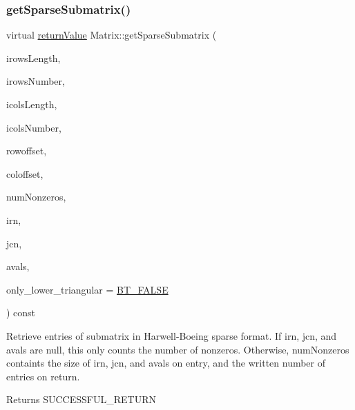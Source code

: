 \subsubsection{\texorpdfstring{get\+Sparse\+Submatrix()}{getSparseSubmatrix()}\hspace{0.1cm}{\footnotesize\ttfamily [4/4]}}
{\footnotesize\ttfamily virtual \hyperlink{_message_handling_8hpp_a81d556f613bfbabd0b1f9488c0fa865e}{return\+Value} Matrix\+::get\+Sparse\+Submatrix (\begin{DoxyParamCaption}\item[{\hyperlink{_types_8hpp_ab6fd6105e64ed14a0c9281326f05e623}{int\+\_\+t}}]{irows\+Length,  }\item[{const \hyperlink{_types_8hpp_ab6fd6105e64ed14a0c9281326f05e623}{int\+\_\+t} $\ast$const}]{irows\+Number,  }\item[{\hyperlink{_types_8hpp_ab6fd6105e64ed14a0c9281326f05e623}{int\+\_\+t}}]{icols\+Length,  }\item[{const \hyperlink{_types_8hpp_ab6fd6105e64ed14a0c9281326f05e623}{int\+\_\+t} $\ast$const}]{icols\+Number,  }\item[{\hyperlink{_types_8hpp_ab6fd6105e64ed14a0c9281326f05e623}{int\+\_\+t}}]{rowoffset,  }\item[{\hyperlink{_types_8hpp_ab6fd6105e64ed14a0c9281326f05e623}{int\+\_\+t}}]{coloffset,  }\item[{\hyperlink{_types_8hpp_ab6fd6105e64ed14a0c9281326f05e623}{int\+\_\+t} \&}]{num\+Nonzeros,  }\item[{\hyperlink{_types_8hpp_ab6fd6105e64ed14a0c9281326f05e623}{int\+\_\+t} $\ast$}]{irn,  }\item[{\hyperlink{_types_8hpp_ab6fd6105e64ed14a0c9281326f05e623}{int\+\_\+t} $\ast$}]{jcn,  }\item[{\hyperlink{qp_o_a_s_e_s__wrapper_8h_a0d00e2b3dfadee81331bbb39068570c4}{real\+\_\+t} $\ast$}]{avals,  }\item[{\hyperlink{_types_8hpp_a20f82124c82b6f5686a7fce454ef9089}{Boolean\+Type}}]{only\+\_\+lower\+\_\+triangular = {\ttfamily \hyperlink{_types_8hpp_a20f82124c82b6f5686a7fce454ef9089a85b8a20e72a8bea5dd10a6007fe3071e}{B\+T\+\_\+\+F\+A\+L\+SE}} }\end{DoxyParamCaption}) const\hspace{0.3cm}{\ttfamily [pure virtual]}}

Retrieve entries of submatrix in Harwell-\/\+Boeing sparse format. If irn, jcn, and avals are null, this only counts the number of nonzeros. Otherwise, num\+Nonzeros containts the size of irn, jcn, and avals on entry, and the written number of entries on return. \begin{DoxyReturn}{Returns}
S\+U\+C\+C\+E\+S\+S\+F\+U\+L\+\_\+\+R\+E\+T\+U\+RN 
\end{DoxyReturn}

